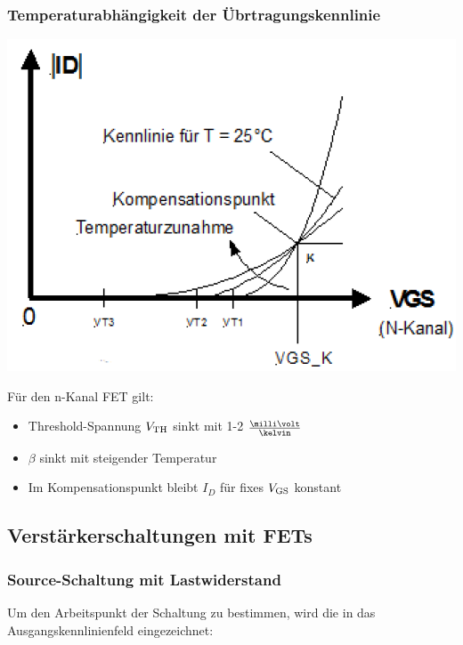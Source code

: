 \subsubsection{Temperaturabhängigkeit der Übrtragungskennlinie}

\begin{minipage}[c]{0.4\columnwidth}
    \includegraphics[width= \columnwidth]{images/mos_fet_eingangskennlinie_temperatur.png}
\end{minipage}
\hfill
\begin{minipage}[c]{0.58\columnwidth}
    Für den n-Kanal FET gilt:
    \begin{itemize}
        \item Threshold-Spannung $V_{\rm TH}$ sinkt mit 1-2 $\frac{\milli \volt}{\kelvin}$
        \item $\beta$ sinkt mit steigender Temperatur
        \item Im Kompensationspunkt bleibt $I_D$ für fixes $V_{\rm GS}$ konstant
    \end{itemize}
\end{minipage}

    
\subsection{Verstärkerschaltungen mit FETs}

\subsubsection{Source-Schaltung mit Lastwiderstand}

Um den Arbeitspunkt der Schaltung zu bestimmen, wird die  in das
Ausgangskennlinienfeld eingezeichnet:

